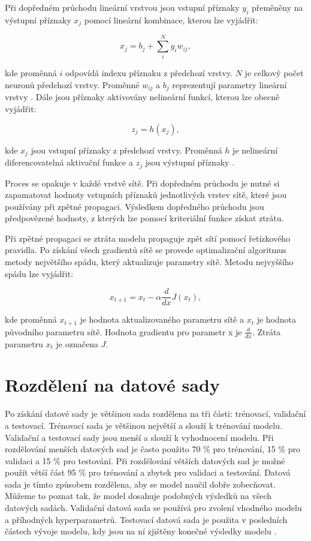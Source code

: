 \documentclass[FM,BP]{tulthesis}
\begin{document}
Při dopředném průchodu lineární vrstvou jsou vstupní příznaky $ y_i $ přeměněny na výstupní příznaky $ x_j $ pomocí lineární kombinace, kterou lze vyjádřit:

\begin{equation}
\label{eqn:linear_layer}
x_j = b_j + \sum_{i}^{N} y_i w_{ij},
\end{equation}

kde proměnná $ i $ odpovídá indexu příznaku z předchozí vrstvy. $ N $ je celkový počet neuronů předchozí vrstvy. Proměnné $ w_{ij} $ a $ b_j $ reprezentují parametry lineární vrstvy \cite{MATEJU2021327}. Dále jsou příznaky aktivovány nelineární funkcí, kterou lze obecně vyjádřit:

\begin{equation}
\label{eqn:activation}
z_j = h(x_j),
\end{equation}

kde $ x_j $ jsou vstupní příznaky z předchozí vrstvy. Proměnná $ h $ je nelineární diferencovatelná aktivační funkce a $ z_j $ jsou výstupní příznaky \cite{DBLP:books/lib/Bishop07}.

Proces se opakuje v každé vrstvě sítě. Při dopředném průchodu je nutné si zapamatovat hodnoty vstupních příznaků jednotlivých vrstev sítě, které jsou používány při zpětné propagaci. Výsledkem dopředného průchodu jsou předpovězené hodnoty, z kterých lze pomocí kriteriální funkce získat ztrátu.

Při zpětné propagaci se ztráta modelu propaguje zpět sítí pomocí řetízkového pravidla. Po získání všech gradientů sítě se provede optimalizační algoritmus metody největšího spádu, který aktualizuje parametry sítě. Metodu nejvyššího spádu lze vyjádřit:

\begin{equation}
\label{eqn:gradient_descent}
x_{t+1} = x_t - \alpha \frac{d}{dx}J(x_t),
\end{equation}

kde proměnná $ x_{t+1} $ je hodnota aktualizovaného parametru sítě a $ x_t $ je hodnota původního parametru sítě. Hodnota gradientu pro parametr x je $ \frac{d}{dx} $. Ztráta parametru $ x_t $ je označena $ J $.

\section{Rozdělení na datové sady} %
Po získání datové sady je většinou sada rozdělena na tři části: trénovací, validační a testovací. Trénovací sada je většinou největší a slouží k trénování modelu. Validační a testovací sady jsou menší a slouží k vyhodnocení modelu. Při rozdělování menších datových sad je často použito 70 \% pro trénování, 15 \% pro validaci a 15 \% pro testování. Při rozdělování větších datových sad je možné použít větší část 95 \% pro trénování a zbytek pro validaci a testování. Datová sada je tímto způsobem rozdělena, aby se model naučil dobře zobecňovat. Můžeme to poznat tak, že model dosahuje podobných výsledků na všech datových sadách. Validační datová sada se používá pro zvolení vhodného modelu a příhodných hyperparametrů. Testovací datová sada je použita v posledních částech vývoje modelu, kdy jsou na ní zjištěny konečné výsledky modelu \cite{burkov2019hundred}.
\end{document}
